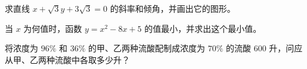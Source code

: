 \begin{question}
求直线 $x+\sqrt3y+3\sqrt3=0$ 的斜率和倾角，并画出它的图形。

\end{question}
\begin{question}
当 $x$ 为何值时，函数 $y=x^2-8x+5$ 的值最小，并求出这个最小值。

\end{question}
\begin{question}
将浓度为 $96\%$ 和 $36\%$ 的甲、乙两种流酸配制成浓度为 $70\%$ 的流酸 $600$ 升，问应从甲、乙两种流酸中各取多少升？

\end{question}